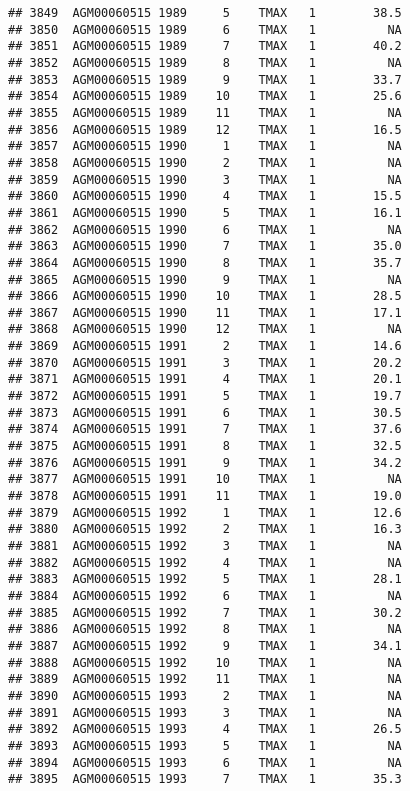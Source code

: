 \documentclass{article}\usepackage[]{graphicx}\usepackage[]{color}
\makeatletter
\newenvironment{kframe}{%
 \def\at@end@of@kframe{}%
 \ifinner\ifhmode%
  \def\at@end@of@kframe{\end{minipage}}%
  \begin{minipage}{\columnwidth}%
 \fi\fi%
 \def\FrameCommand##1{\hskip\@totalleftmargin \hskip-\fboxsep
 \colorbox{shadecolor}{##1}\hskip-\fboxsep
     \hskip-\linewidth \hskip-\@totalleftmargin \hskip\columnwidth}%
 \MakeFramed {\advance\hsize-\width
   \@totalleftmargin\z@ \linewidth\hsize
   \@setminipage}}%
 {\par\unskip\endMakeFramed%
 \at@end@of@kframe}
\newenvironment{knitrout}{}{} %
\makeatother
\begin{document}
\begin{knitrout}
\begin{kframe}
\begin{verbatim}
## 3849  AGM00060515 1989     5    TMAX   1        38.5
## 3850  AGM00060515 1989     6    TMAX   1          NA
## 3851  AGM00060515 1989     7    TMAX   1        40.2
## 3852  AGM00060515 1989     8    TMAX   1          NA
## 3853  AGM00060515 1989     9    TMAX   1        33.7
## 3854  AGM00060515 1989    10    TMAX   1        25.6
## 3855  AGM00060515 1989    11    TMAX   1          NA
## 3856  AGM00060515 1989    12    TMAX   1        16.5
## 3857  AGM00060515 1990     1    TMAX   1          NA
## 3858  AGM00060515 1990     2    TMAX   1          NA
## 3859  AGM00060515 1990     3    TMAX   1          NA
## 3860  AGM00060515 1990     4    TMAX   1        15.5
## 3861  AGM00060515 1990     5    TMAX   1        16.1
## 3862  AGM00060515 1990     6    TMAX   1          NA
## 3863  AGM00060515 1990     7    TMAX   1        35.0
## 3864  AGM00060515 1990     8    TMAX   1        35.7
## 3865  AGM00060515 1990     9    TMAX   1          NA
## 3866  AGM00060515 1990    10    TMAX   1        28.5
## 3867  AGM00060515 1990    11    TMAX   1        17.1
## 3868  AGM00060515 1990    12    TMAX   1          NA
## 3869  AGM00060515 1991     2    TMAX   1        14.6
## 3870  AGM00060515 1991     3    TMAX   1        20.2
## 3871  AGM00060515 1991     4    TMAX   1        20.1
## 3872  AGM00060515 1991     5    TMAX   1        19.7
## 3873  AGM00060515 1991     6    TMAX   1        30.5
## 3874  AGM00060515 1991     7    TMAX   1        37.6
## 3875  AGM00060515 1991     8    TMAX   1        32.5
## 3876  AGM00060515 1991     9    TMAX   1        34.2
## 3877  AGM00060515 1991    10    TMAX   1          NA
## 3878  AGM00060515 1991    11    TMAX   1        19.0
## 3879  AGM00060515 1992     1    TMAX   1        12.6
## 3880  AGM00060515 1992     2    TMAX   1        16.3
## 3881  AGM00060515 1992     3    TMAX   1          NA
## 3882  AGM00060515 1992     4    TMAX   1          NA
## 3883  AGM00060515 1992     5    TMAX   1        28.1
## 3884  AGM00060515 1992     6    TMAX   1          NA
## 3885  AGM00060515 1992     7    TMAX   1        30.2
## 3886  AGM00060515 1992     8    TMAX   1          NA
## 3887  AGM00060515 1992     9    TMAX   1        34.1
## 3888  AGM00060515 1992    10    TMAX   1          NA
## 3889  AGM00060515 1992    11    TMAX   1          NA
## 3890  AGM00060515 1993     2    TMAX   1          NA
## 3891  AGM00060515 1993     3    TMAX   1          NA
## 3892  AGM00060515 1993     4    TMAX   1        26.5
## 3893  AGM00060515 1993     5    TMAX   1          NA
## 3894  AGM00060515 1993     6    TMAX   1          NA
## 3895  AGM00060515 1993     7    TMAX   1        35.3

\end{verbatim}
\end{kframe}
\end{knitrout}
\end{document}
